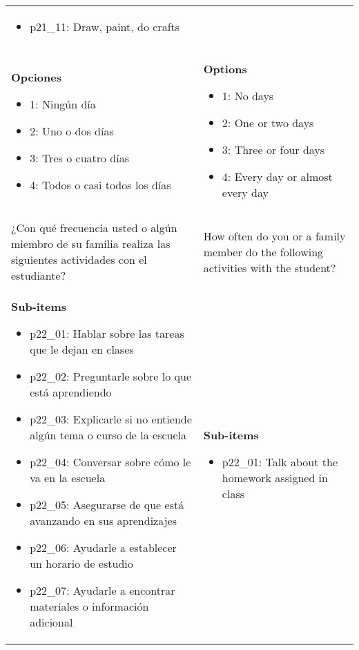\documentclass[11pt]{article}
\begin{document}
\begin{longtable}{@{}LL@{}}
\begin{itemize}[leftmargin=*]
\item p21\_11: Draw, paint, do crafts\end{itemize} \\
\textbf{Opciones}\par\begin{itemize}[leftmargin=*]\item 1: Ningún día
\item 2: Uno o dos días
\item 3: Tres o cuatro días
\item 4: Todos o casi todos los días\end{itemize} & \textbf{Options}\par\begin{itemize}[leftmargin=*]\item 1: No days
\item 2: One or two days
\item 3: Three or four days
\item 4: Every day or almost every day\end{itemize} \\
\addlinespace[4pt]
 \\ 
¿Con qué frecuencia usted o algún miembro de su familia realiza las siguientes actividades con el estudiante? & How often do you or a family member do the following activities with the student? \\
\textbf{Sub-items}\par\begin{itemize}[leftmargin=*]\item p22\_01: Hablar sobre las tareas que le dejan en clases
\item p22\_02: Preguntarle sobre lo que está aprendiendo
\item p22\_03: Explicarle si no entiende algún tema o curso de la escuela
\item p22\_04: Conversar sobre cómo le va en la escuela
\item p22\_05: Asegurarse de que está avanzando en sus aprendizajes
\item p22\_06: Ayudarle a establecer un horario de estudio
\item p22\_07: Ayudarle a encontrar materiales o información adicional\end{itemize} & \textbf{Sub-items}\par\begin{itemize}[leftmargin=*]\item p22\_01: Talk about the homework assigned in class

\end{itemize}
\end{longtable}
\end{document}
